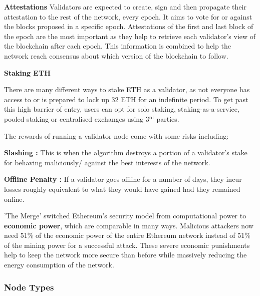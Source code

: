 \textbf{Attestations}
\label{attestationLitRev}
Validators are expected to create, sign and then propagate their attestation to the rest of the network, every epoch. It aims to vote for or against the blocks proposed in a specific epoch. Attestations of the first and last block of the epoch are the most important as they help to retrieve each validator's view of the blockchain after each epoch. This information is combined to help the network reach consensus about which version of the blockchain to follow.
 
\textbf{Staking ETH}

There are many different ways to stake ETH as a validator, as not everyone has access to or is prepared to lock up 32 ETH for an indefinite period. To get past this high barrier of entry, users can opt for solo staking, staking-as-a-service, pooled staking or centralised exchanges using 3$\mathrm{^{rd}}$ parties. 

The rewards of running a validator node come with some risks including:
 
\textbf{Slashing :}
This is when the algorithm destroys a portion of a validator's stake for behaving maliciously/ against the best interests of the network.

\textbf{Offline Penalty :}
If a validator goes offline for a number of days, they incur losses roughly equivalent to what they would have gained had they remained online. 

'The Merge' switched Ethereum's security model from computational power to \textbf{economic power}, which are comparable in many ways. Malicious attackers now need 51\% of the economic power of the entire Ethereum network instead of 51\% of the mining power for a successful attack. These severe economic punishments help to keep the network more secure than before while massively reducing the energy consumption of the network. 



\subsubsection{Node Types}

